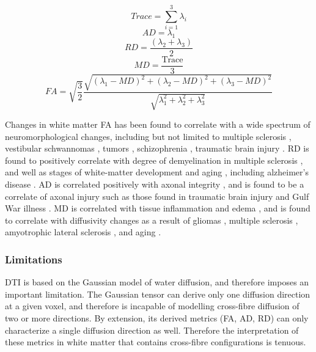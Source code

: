 \begin{equation}
Trace = \sum_{i=1}^{3} \lambda_i
\end{equation}
\begin{equation}
AD = \lambda_1
\end{equation}
\begin{equation}
RD = \frac{(\lambda_2+\lambda_3)}{2}
\end{equation}
\begin{equation}
MD = \frac{\text{Trace}}{3}
\end{equation}
\begin{equation}
FA = \sqrt{\frac{3}{2}}\frac{\sqrt{(\lambda_1-MD)^2 + (\lambda_2-MD)^2 + (\lambda_3-MD)^2}}{\sqrt{\lambda_1^2+\lambda_2^2+\lambda_3^2}}
\end{equation}

Changes in white matter FA has been found to correlate with a wide spectrum of neuromorphological changes, including but not limited to multiple sclerosis , vestibular schwannomas , tumors , schizophrenia , traumatic brain injury . RD is found to positively correlate with degree of demyelination in multiple sclerosis , and well as stages of white-matter development and aging , including alzheimer's disease . AD is correlated positively with axonal integrity , and is found to be a correlate of axonal injury  such as those found in traumatic brain injury  and Gulf War illness . MD is correlated with tissue inflammation and edema , and is found to correlate with diffusivity changes as a result of gliomas , multiple sclerosis , amyotrophic lateral sclerosis , and aging .

\subsubsection{Limitations}

DTI is based on the Gaussian model of water diffusion, and therefore imposes an important limitation. The Gaussian tensor can derive only one diffusion direction at a given voxel, and therefore is incapable of modelling cross-fibre diffusion of two or more directions. By extension, its derived metrics (FA, AD, RD) can only characterize a single diffusion direction as well. Therefore the interpretation of these metrics in white matter that contains cross-fibre configurations is tenuous.  

